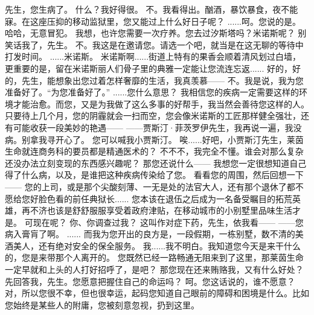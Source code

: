 \documentclass[openany]{book}
\begin{document}
\begin{dialogue}
     先生，您生病了。
     什么？我好得很。
     不。我看得出。酗酒，暴饮暴食，夜不能寐。在这座压抑的移动监狱里，您又能过上什么好日子呢？
     ......呵。您说的是。
     哈哈，无意冒犯。
     我想，也许您需要一次疗养。您去过汐斯塔吗？米诺斯呢？
     别笑话我了，先生。
     不。我这是在邀请您。请选一个吧，就当是在这无聊的等待中打发时间。
     ......米诺斯。
     米诺斯啊......街道上特有的果香会顺着清风划过白墙，更重要的是，留在米诺斯丽人们骨子里的典雅一定能让您流连忘返......
     好的，好的，先生，能想象出您过着怎样奢靡的生活，我真羡慕——
     不。我是说，我为您准备好了。“为您准备好了。”
     ......您什么意思？
     我相信您的疾病一定需要这样的环境才能治愈。而您，又是为我做了这么多事的好帮手，我当然会善待您这样的人。
     只要待上几个月，您的阴霾就会一扫而空，您会像米诺斯的工匠那样健全强壮，还有可能收获一段美妙的艳遇——
     ——贾斯汀·菲茨罗伊先生，我再说一遍，我没病。别拿我寻开心了。
     您可以喊我小贾斯汀。
     唉......好吧，小贾斯汀先生，莱茵生命就连商务科的要员都是精通医术的？
     不不不，我完全不懂。谁会对那么复杂还没办法立刻变现的东西感兴趣呢？
     那您还说什么——
     我想您一定很想知道自己得了什么病，以及，是谁把这种疾病传染给了您。
     看看您的周围，然后回想一下——
     您的上司，或是那个尖酸刻薄、一无是处的法官大人，还有那个退休了都不愿给您好脸色看的前任典狱长......
     您本该在退伍之后成为一名备受瞩目的拓荒英雄，再不济也该是舒舒服服享受着政府津贴，在移动城市的小别墅里品味生活才是。
     可现在呢？
     你、你调查过我？
     这叫作对症下药，先生，依我看——
     ——您病入膏肓了啊。
     ......
     而我为您开出的良方是，一段假期，一栋别墅，数不清的美酒美人，还有绝对安全的保全服务。
     我......我不明白。我知道您今天是来干什么的，您是来带那个人离开的。
     您既然已经一路畅通无阻来到了这里，那莱茵生命一定早就和上头的人打好招呼了，是吧？
     那您现在还来贿赂我，又有什么好处？
     先回答我，先生。您愿意把握住自己的命运吗？
     呵。您这话说的，谁不愿意？
     对，所以您很不幸，但也很幸运，起码您知道自己眼前的障碍和困境是什么。比如您始终是某些人的附庸，您被刻意忽视，扔到这里。

\end{dialogue}
\end{document}
